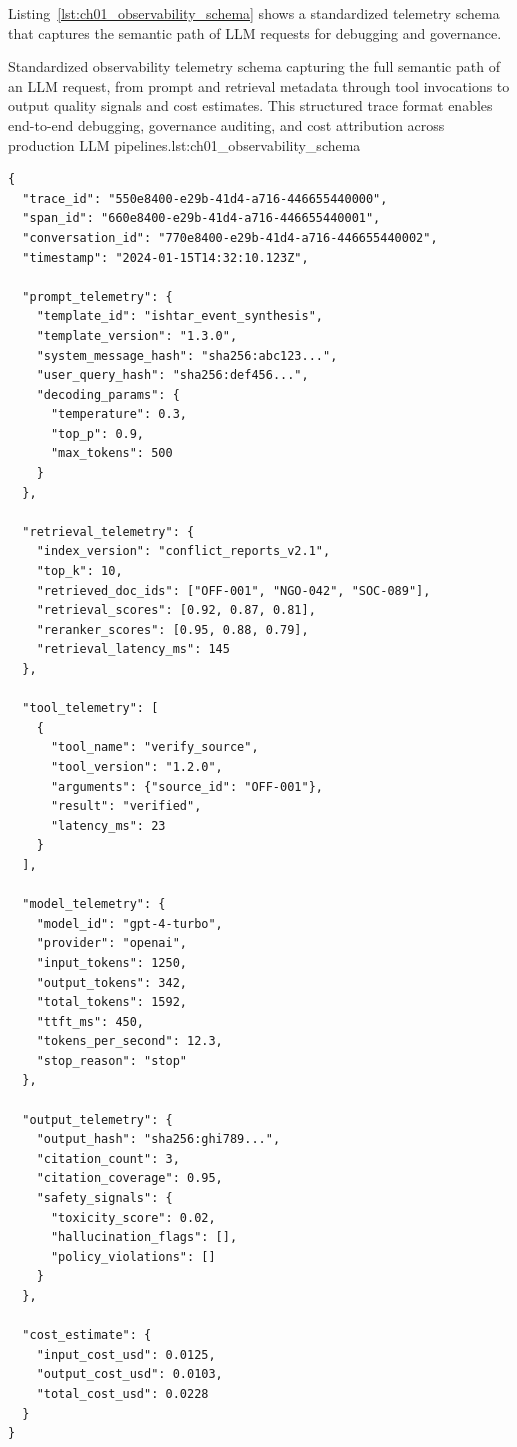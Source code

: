 Listing~\ref{lst:ch01_observability_schema} shows a standardized telemetry schema that captures the semantic path of LLM requests for debugging and governance.

\begin{codebox}{Standardized observability telemetry schema capturing the full semantic path of an LLM request, from prompt and retrieval metadata through tool invocations to output quality signals and cost estimates. This structured trace format enables end-to-end debugging, governance auditing, and cost attribution across production LLM pipelines.}{lst:ch01_observability_schema}
\begin{verbatim}
{
  "trace_id": "550e8400-e29b-41d4-a716-446655440000",
  "span_id": "660e8400-e29b-41d4-a716-446655440001",
  "conversation_id": "770e8400-e29b-41d4-a716-446655440002",
  "timestamp": "2024-01-15T14:32:10.123Z",

  "prompt_telemetry": {
    "template_id": "ishtar_event_synthesis",
    "template_version": "1.3.0",
    "system_message_hash": "sha256:abc123...",
    "user_query_hash": "sha256:def456...",
    "decoding_params": {
      "temperature": 0.3,
      "top_p": 0.9,
      "max_tokens": 500
    }
  },

  "retrieval_telemetry": {
    "index_version": "conflict_reports_v2.1",
    "top_k": 10,
    "retrieved_doc_ids": ["OFF-001", "NGO-042", "SOC-089"],
    "retrieval_scores": [0.92, 0.87, 0.81],
    "reranker_scores": [0.95, 0.88, 0.79],
    "retrieval_latency_ms": 145
  },

  "tool_telemetry": [
    {
      "tool_name": "verify_source",
      "tool_version": "1.2.0",
      "arguments": {"source_id": "OFF-001"},
      "result": "verified",
      "latency_ms": 23
    }
  ],

  "model_telemetry": {
    "model_id": "gpt-4-turbo",
    "provider": "openai",
    "input_tokens": 1250,
    "output_tokens": 342,
    "total_tokens": 1592,
    "ttft_ms": 450,
    "tokens_per_second": 12.3,
    "stop_reason": "stop"
  },

  "output_telemetry": {
    "output_hash": "sha256:ghi789...",
    "citation_count": 3,
    "citation_coverage": 0.95,
    "safety_signals": {
      "toxicity_score": 0.02,
      "hallucination_flags": [],
      "policy_violations": []
    }
  },

  "cost_estimate": {
    "input_cost_usd": 0.0125,
    "output_cost_usd": 0.0103,
    "total_cost_usd": 0.0228
  }
}
\end{verbatim}
\end{codebox}

